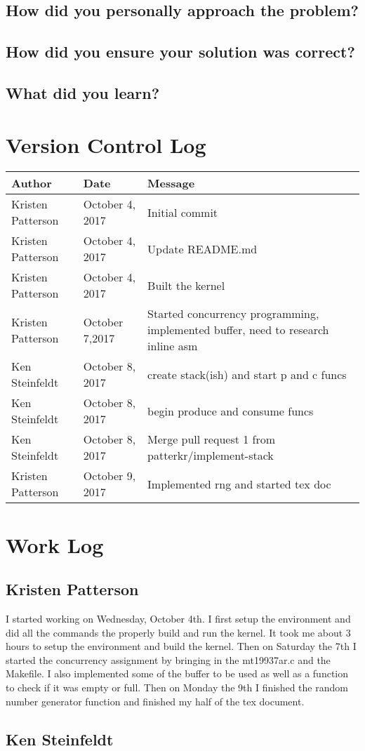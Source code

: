 \documentclass[10pt,letterpaper,onecolumn,draftclsnofoot]{IEEEtran}
\begin{document}
\subsection{How did you personally approach the problem?}

\subsection{How did you ensure your solution was correct?}

\subsection{What did you learn?}

\section{Version Control Log}

\begin{center}
	\begin{tabular}{|l|l|l|}
		\hline
		\textbf{Author} & \textbf{Date} & \textbf{Message} \\ \hline
		Kristen Patterson & October 4, 2017 & Initial commit \\ \hline
		Kristen Patterson & October 4, 2017 & Update README.md \\ \hline
		Kristen Patterson & October 4, 2017 & Built the kernel \\ \hline
		Kristen Patterson & October 7,2017 & Started concurrency programming, implemented buffer, need to research inline asm \\ \hline
		Ken Steinfeldt & October 8, 2017 & create stack(ish) and start p and c funcs \\ \hline
		Ken Steinfeldt & October 8, 2017 & begin produce and consume funcs \\ \hline
		Ken Steinfeldt & October 8, 2017 & Merge pull request 1 from patterkr/implement-stack \\ \hline
		Kristen Patterson & October 9, 2017 & Implemented rng and started tex doc \\ \hline
	\end{tabular}
\end{center}

\section{Work Log}
\subsection{Kristen Patterson}
I started working on Wednesday, October 4th. I first setup the environment and 
did all the commands the properly build and run the kernel. It took me about 
3 hours to setup the environment and build the kernel. Then on Saturday the 7th
I started the concurrency assignment by bringing in the mt19937ar.c and the 
Makefile. I also implemented some of the buffer to be used as well as a 
function to check if it was empty or full. Then on Monday the 9th I finished 
the random number generator function and finished my half of the tex document.

\subsection{Ken Steinfeldt}
\end{document}
